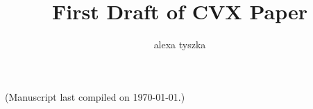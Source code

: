 \documentclass{article}
\title{First Draft of CVX Paper}
\author{alexa tyszka}
\date{}
\begin{document}





\maketitle

(Manuscript last compiled on \today.)

\end{document}
